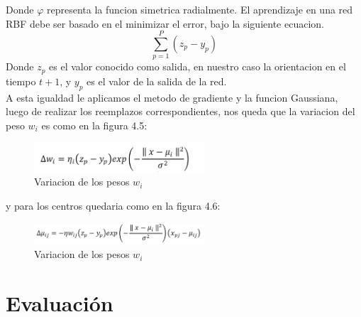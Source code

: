 \documentclass[conference]{IEEEtran}
\begin{document}
Donde $\varphi$ representa la funcion simetrica radialmente.
El aprendizaje en una red RBF debe ser basado en el minimizar el error, bajo la siguiente ecuacion.
\[
\sum_{p=1}^{P}(z_p-y_p)
\]
Donde $z_p$ es el valor conocido como salida, en nuestro caso la orientacion en el tiempo $t+1$, y $y_p$ es el valor de la salida de la red.\\
A esta igualdad le aplicamos el metodo de gradiente y la funcion Gaussiana,  luego de realizar los reemplazos correspondientes, nos queda que la variacion  del peso $w_i$ es como en la figura 4.5:\\
\begin{figure}
\centering
\includegraphics[width=2.5in]{eq1.pdf}
\caption{Variacion de los pesos $w_i$ }
\label{fig_cir}
\end{figure}
y para los centros quedaria como en la figura 4.6:\\
\begin{figure}
\centering
\includegraphics[width=2.5in]{eq2.pdf}
\caption{Variacion de los pesos $w_i$ }
\label{fig_cir}
\end{figure}

\section{Evaluaci\'on}
\end{document}
